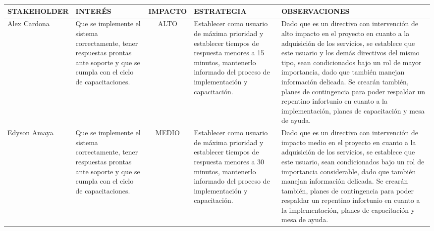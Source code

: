 \begin{table}[H]
	\centering
	\begin{tabular}{| p{3cm} | p{5cm} | c | p{5cm} | p{5cm} |}
	\hline
	\rowcolor{LightGrey}
	\textbf{STAKEHOLDER} & \textbf{INTER\'ES} & \textbf{IMPACTO} & \textbf{ESTRATEGIA} & 
	\textbf{OBSERVACIONES} \\ \hline	
	
	Alex Cardona & Que se implemente el sistema correctamente, tener respuestas prontas
	ante soporte y que se cumpla con el ciclo de capacitaciones. & ALTO & Establecer como 
	usuario de m\'axima prioridad y establecer tiempos de respuesta menores a 15 minutos, 
	mantenerlo informado del proceso de implementaci\'on y capacitaci\'on. & Dado que es un directivo 
	con intervenci\'on de alto impacto en el proyecto en cuanto a la adquisici\'on de los servicios,
	se establece que este usuario y los dem\'as directivos del mismo tipo, sean condicionados bajo un
	rol de mayor importancia, dado que tambi\'en manejan informaci\'on delicada. Se crear\'an tambi\'en,
	planes de contingencia para poder respaldar un repentino infortunio en cuanto a la implementaci\'on,
	planes de capacitaci\'on y mesa de ayuda.\\
	\hline

	Edyson Amaya & Que se implemente el sistema correctamente, tener respuestas prontas
	ante soporte y que se cumpla con el ciclo de capacitaciones. & MEDIO & Establecer como 
	usuario de m\'axima prioridad y establecer tiempos de respuesta menores a 30 minutos, 
	mantenerlo informado del proceso de implementaci\'on y capacitaci\'on. & Dado que es un directivo 
	con intervenci\'on de impacto medio en el proyecto en cuanto a la adquisici\'on de los servicios,
	se establece que este usuario, sean condicionados bajo un 	rol de importancia considerable, dado 
	que tambi\'en manejan informaci\'on delicada. Se crear\'an tambi\'en,
	planes de contingencia para poder respaldar un repentino infortunio en cuanto a la implementaci\'on,
	planes de capacitaci\'on y mesa de ayuda.\\
	\hline
	\end{tabular}
\end{table}
%
